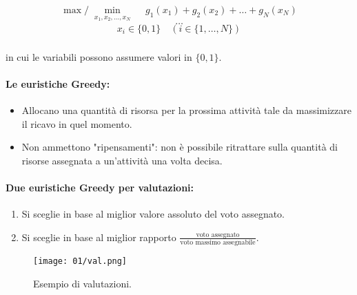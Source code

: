 \begin{equation}
    \max/\min_{\substack{x_1, x_2, \dots, x_N}} \quad g_1(x_1) + g_2(x_2) + \dots + g_N(x_N)
\end{equation}
\[
    \dots
\]
\begin{equation}
  x_i \in \{0, 1\} \quad (i \in \{1, \dots, N\})
\end{equation}
\subsubsection{}
in cui le variabili possono assumere valori in $\{0, 1\}$.


\paragraph{Le euristiche Greedy:}

\begin{itemize}
  \item Allocano una quantità di risorsa per la prossima attività tale da massimizzare il ricavo in quel momento. 
  \item Non ammettono "ripensamenti": non è possibile ritrattare sulla quantità di risorse assegnata a un'attività una volta decisa.
\end{itemize}

\paragraph{Due euristiche Greedy per valutazioni:}

\begin{enumerate}
  \item Si sceglie in base al miglior valore assoluto del voto assegnato. 
  \item Si sceglie in base al miglior rapporto $\frac{\text{voto assegnato}}{\text{voto massimo assegnabile}}$.
\end{enumerate}

  \begin{figure}[h]
    \centering
    \texttt{[image: 01/val.png]}
    \caption{Esempio di valutazioni.}
  \end{figure}


